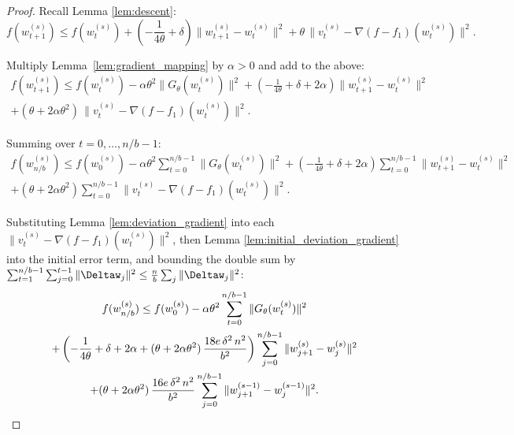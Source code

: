 \documentclass{article}
\begin{document}
\begin{proof}
Recall Lemma \ref{lem:descent}:
\[
f(w_{t+1}^{(s)}) \leq f(w_t^{(s)}) 
+ \left(-\frac{1}{4\theta} + \delta\right)
\|w_{t+1}^{(s)} - w_t^{(s)}\|^2 
+ \theta\,\|v_t^{(s)} - \nabla(f{-}f_1)(w_t^{(s)})\|^2.
\]

Multiply Lemma~\ref{lem:gradient_mapping} by $\alpha > 0$ 
and add to the above:
\begin{multline*}
f(w_{t+1}^{(s)}) \leq f(w_t^{(s)}) 
- \alpha\theta^2\|G_\theta(w_t^{(s)})\|^2 
+ \left(-\frac{1}{4\theta} + \delta + 2\alpha\right)
\|w_{t+1}^{(s)} - w_t^{(s)}\|^2 \\
+ (\theta + 2\alpha\theta^2)\,
\|v_t^{(s)} - \nabla(f{-}f_1)(w_t^{(s)})\|^2.
\end{multline*}

Summing over $t = 0, \ldots, n/b - 1$:
\begin{multline*}
f(w_{n/b}^{(s)}) \leq f(w_0^{(s)}) 
- \alpha\theta^2 \sum_{t=0}^{n/b-1}\|G_\theta(w_t^{(s)})\|^2 
+ \left(-\frac{1}{4\theta} + \delta + 2\alpha\right)
\sum_{t=0}^{n/b-1}\|w_{t+1}^{(s)} - w_t^{(s)}\|^2 \\
+ (\theta + 2\alpha\theta^2)
\sum_{t=0}^{n/b-1}\|v_t^{(s)} 
- \nabla(f{-}f_1)(w_t^{(s)})\|^2.
\end{multline*}

Substituting Lemma \ref{lem:deviation_gradient} 
into each $\|v_t^{(s)} - \nabla(f{-}f_1)(w_t^{(s)})\|^2$, 
then Lemma \ref{lem:initial_deviation_gradient}
into the initial error term, and bounding the double sum by
$\sum_{t=1}^{n/b-1}\sum_{j=0}^{t-1}\|\Deltaw_j\|^2 
\leq \frac{n}{b}\sum_{j}\|\Deltaw_j\|^2$:
\begin{multline*}
f(w_{n/b}^{(s)}) \leq f(w_0^{(s)}) 
- \alpha\theta^2\sum_{t=0}^{n/b-1}\|G_\theta(w_t^{(s)})\|^2 \\
+ \left(-\frac{1}{4\theta} + \delta + 2\alpha 
+ (\theta + 2\alpha\theta^2)\,
\frac{18e\,\delta^2\,n^2}{b^2}\right)
\sum_{j=0}^{n/b-1}\|w_{j+1}^{(s)} - w_j^{(s)}\|^2 \\
+ (\theta + 2\alpha\theta^2)\,
\frac{16e\,\delta^2\,n^2}{b^2}
\sum_{j=0}^{n/b-1}\|w_{j+1}^{(s-1)} - w_j^{(s-1)}\|^2.
\qedhere
\end{multline*}
\end{proof}
\end{document}
